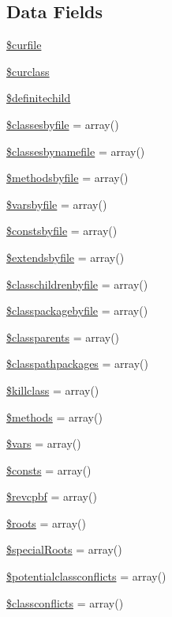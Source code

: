 \subsection*{\-Data \-Fields}
\begin{DoxyCompactItemize}
\item 
\hyperlink{class_classes_a84352b4d740a45279b61228864b9b5e7}{\$curfile}
\item 
\hyperlink{class_classes_aef75378be82016414a5efa2c96d6e7ba}{\$curclass}
\item 
\hyperlink{class_classes_a3bfcd7033b3a72a42d39b10adf37c69b}{\$definitechild}
\item 
\hyperlink{class_classes_a2a2ff0e6f711ae176942be1d614972ad}{\$classesbyfile} = array()
\item 
\hyperlink{class_classes_a4fd38347c9554456653235bf3fa8afab}{\$classesbynamefile} = array()
\item 
\hyperlink{class_classes_ac74d15bf01d2ee54e7eb9d42b234170e}{\$methodsbyfile} = array()
\item 
\hyperlink{class_classes_a353de2400374e39aad749f19bc58e430}{\$varsbyfile} = array()
\item 
\hyperlink{class_classes_a9b637e5d0487ef23e3c08ed07054853e}{\$constsbyfile} = array()
\item 
\hyperlink{class_classes_abcf0059662798e569d59c2c18a217a2e}{\$extendsbyfile} = array()
\item 
\hyperlink{class_classes_acc9a28185c241a424b8d9aea537b192b}{\$classchildrenbyfile} = array()
\item 
\hyperlink{class_classes_a5d9a6142abcf9fccff231de2fab31480}{\$classpackagebyfile} = array()
\item 
\hyperlink{class_classes_afd4d2f82b7fd322ecacd8c92b876a10b}{\$classparents} = array()
\item 
\hyperlink{class_classes_a28c52044682149838410415e24598fe9}{\$classpathpackages} = array()
\item 
\hyperlink{class_classes_a67455ac1c751cd5e5b977f7153c037fa}{\$killclass} = array()
\item 
\hyperlink{class_classes_a802753499268a04da139bd6e6ef89b35}{\$methods} = array()
\item 
\hyperlink{class_classes_a09f2c833c130b4443725fb576d9d5269}{\$vars} = array()
\item 
\hyperlink{class_classes_a34ba5984e16f17633afe3930711d89fb}{\$consts} = array()
\item 
\hyperlink{class_classes_a7b960874a2bd62df1a63a44e7d1c9fbc}{\$revcpbf} = array()
\item 
\hyperlink{class_classes_a1263b69321a1f7d5d4fa51ccf2cf7206}{\$roots} = array()
\item 
\hyperlink{class_classes_ac4151ddad47b26840812370fe76efea3}{\$special\-Roots} = array()
\item 
\hyperlink{class_classes_a9f4fb9165292699992be027973f44e7a}{\$potentialclassconflicts} = array()
\item 
\hyperlink{class_classes_a99ba238c5cedfdebd0de0b18085465b4}{\$classconflicts} = array()
\end{DoxyCompactItemize}


